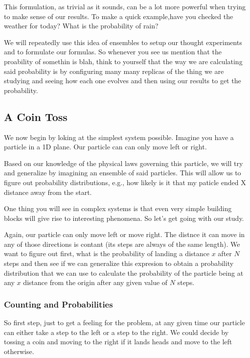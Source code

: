 This formulation, as trivial as it sounds, can be a lot more powerful when trying to make sense of our results.
To make a quick example,have you checked the weather for today? What is the probability of rain?

We will repeatedly use this idea of ensembles to setup our thought experiments and to formulate our formulas.
So whenever you see us mention that the proability of somethin is blah, think to yourself that the way we are calculating said probability is by configuring many many replicas of the thing we are studying and seeing how each one evolves and then using our results to get the probability.

\subsection{A Coin Toss}

We now begin by loking at the simplest system possible.
Imagine you have a particle in a 1D plane.
Our particle can can only move left or right.

Based on our knowledge of the physical laws governing this particle, we will try and generalize by imagining an ensemble of said particles.
This will allow us to figure out probability distributions, e.g., how likely is it that my paticle ended X distance away from the start.

One thing you will see in complex systems is that even very simple building blocks will give rise to interesting phenomena.
So let's get going with our study.

Again, our particle can only move left or move right.
The distnce it can move in any of those directions is contant (its steps are always of the same length).
We want to figure out first, what is the probability of landing a distance $x$ after $N$ steps and then see if we can generalize this expresion to obtain a probability distribution that we can use to calculate the probability of the particle being at any $x$ distance from the origin after any given value of $N$ steps.

\subsubsection{Counting and Probabilities}

So first step, just to get a feeling for the problem, at any given time our particle can either take a step to the left or a step to the right.
We could decide by tossing a coin and moving to the right if it lands heads and move to the left otherwise.


